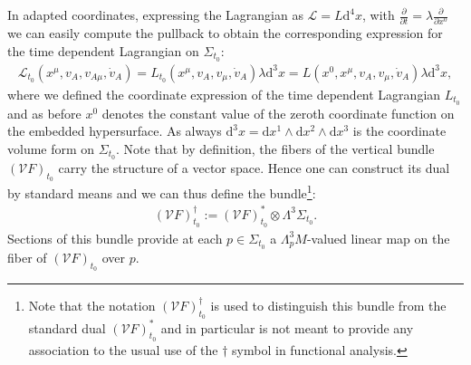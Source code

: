 In adapted coordinates, expressing the Lagrangian as $\mathcal{L} = L \mathrm{d}^4x$, with $\frac{\partial}{\partial t} = \lambda \frac{\partial}{\partial x^0}$ we can easily compute the pullback to obtain the corresponding expression for the time dependent Lagrangian on $\Sigma_{t_0}$:
\begin{align}
    \mathcal{L}_{t_0}(x^{\mu}, v_A, v_{A{\mu}}, \dot{v}_A) = L_{t_0}(x^{\mu}, v_A, v_{\mu}, \dot{v}_A)\lambda \mathrm{d}^3x= L(x^0,x^{\mu}, v_A, v_{\mu}, \dot{v}_A)\lambda \mathrm{d}^3x,
\end{align}
where we defined the coordinate expression of the time dependent Lagrangian $L_{t_0}$ and as before $x^0$ denotes the constant value of the zeroth coordinate function on the embedded hypersurface. As always $\mathrm{d}^3x = \mathrm{d}x^1 \wedge \mathrm{d}x^2 \wedge \mathrm{d}x^3$ is the coordinate volume form on $\Sigma_{t_0}$.
Note that by definition, the fibers of the vertical bundle $(\mathcal{V}F)_{t_0}$ carry the structure of a vector space. 
Hence one can construct its dual by standard means and we can thus define the bundle\footnote{Note that the notation $(\mathcal{V}F)_{t_0}^{\dagger}$ is used to distinguish this bundle from the standard dual $(\mathcal{V}F)_{t_0}^{\ast}$ and in particular is not meant to provide any association to the usual use of the $\dagger$ symbol in functional analysis.}: 
\begin{align}
(\mathcal{V}F)_{t_0}^{\dagger} := (\mathcal{V}F)_{t_0}^{\ast} \otimes \Lambda^3\Sigma_{t_0}.
\end{align}
Sections of this bundle provide at each $p \in \Sigma_{t_0}$ a $\Lambda^3_pM$-valued linear map on the fiber of $(\mathcal{V}F)_{t_0}$ over $p$.

